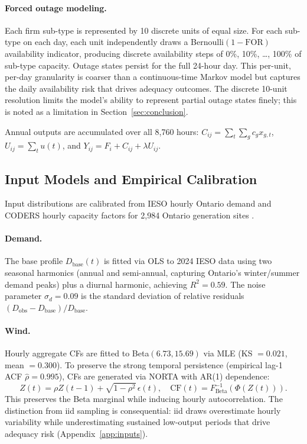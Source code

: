 \documentclass[11pt]{article}
\begin{document}
\paragraph{Forced outage modeling.}
Each firm sub-type is represented by 10 discrete units of equal size. For each sub-type on each day, each unit independently draws a Bernoulli$(1 - \text{FOR})$ availability indicator, producing discrete availability steps of 0\%, 10\%, \ldots, 100\% of sub-type capacity. Outage states persist for the full 24-hour day. This per-unit, per-day granularity is coarser than a continuous-time Markov model but captures the daily availability risk that drives adequacy outcomes. The discrete 10-unit resolution limits the model's ability to represent partial outage states finely; this is noted as a limitation in Section~\ref{sec:conclusion}.

Annual outputs are accumulated over all 8,760 hours: $C_{ij} = \sum_t \sum_g c_g x_{g,t}$, \; $U_{ij} = \sum_t u(t)$, \; and \; $Y_{ij} = F_i + C_{ij} + \lambda U_{ij}$.

\subsection{Input Models and Empirical Calibration}\label{sec:inputs}

Input distributions are calibrated from IESO hourly Ontario demand \citep{IESO2025} and CODERS hourly capacity factors for 2,984 Ontario generation sites \citep{CODERS2025}.

\paragraph{Demand.}
The base profile $D_{\text{base}}(t)$ is fitted via OLS to 2024 IESO data using two seasonal harmonics (annual and semi-annual, capturing Ontario's winter/summer demand peaks) plus a diurnal harmonic, achieving $R^2 = 0.59$. The noise parameter $\sigma_d = 0.09$ is the standard deviation of relative residuals $(D_{\text{obs}} - D_{\text{base}})/D_{\text{base}}$.

\paragraph{Wind.}
Hourly aggregate CFs are fitted to Beta$(6.73, 15.69)$ via MLE (KS $= 0.021$, mean $= 0.300$). To preserve the strong temporal persistence (empirical lag-1 ACF $\hat\rho = 0.995$), CFs are generated via NORTA with AR(1) dependence:
\begin{equation}\label{eq:norta}
  Z(t) = \rho Z(t{-}1) + \sqrt{1-\rho^2}\,\epsilon(t), \quad
  \text{CF}(t) = F_{\text{Beta}}^{-1}(\Phi(Z(t))).
\end{equation}
This preserves the Beta marginal while inducing hourly autocorrelation. The distinction from iid sampling is consequential: iid draws overestimate hourly variability while underestimating sustained low-output periods that drive adequacy risk (Appendix~\ref{app:inputs}).
\end{document}
